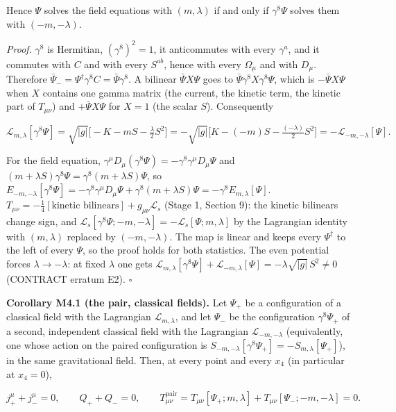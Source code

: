 \documentclass[11pt]{article}
\begin{document}
Hence $\Psi$ solves the field equations with $(m,\lambda)$ if and only if $\gamma^8\Psi$ solves them with $(-m,-\lambda)$.

\emph{Proof.} $\gamma^8$ is Hermitian, $(\gamma^8)^2=1$, it anticommutes with every $\gamma^a$, and it commutes with $C$ and with every $S^{ab}$, hence with every $\Omega_\mu$ and with $D_\mu$. Therefore $\bar\Psi_-=\Psi^\dagger\gamma^8C=\bar\Psi\gamma^8$. A bilinear $\bar\Psi X\Psi$ goes to $\bar\Psi\gamma^8X\gamma^8\Psi$, which is $-\bar\Psi X\Psi$ when $X$ contains one gamma matrix (the current, the kinetic term, the kinetic part of $T_{\mu\nu}$) and $+\bar\Psi X\Psi$ for $X=1$ (the scalar $S$). Consequently

\[
\mathcal L_{m,\lambda}[\gamma^8\Psi]=\sqrt{|g|}\bigl[-K-mS-\tfrac\lambda2S^2\bigr]=-\sqrt{|g|}\bigl[K-(-m)S-\tfrac{(-\lambda)}2S^2\bigr]=-\mathcal L_{-m,-\lambda}[\Psi].
\]

For the field equation, $\gamma^\mu D_\mu(\gamma^8\Psi)=-\gamma^8\gamma^\mu D_\mu\Psi$ and $(m+\lambda S)\gamma^8\Psi=\gamma^8(m+\lambda S)\Psi$, so $E_{-m,-\lambda}[\gamma^8\Psi]=-\gamma^8\gamma^\mu D_\mu\Psi+\gamma^8(m+\lambda S)\Psi=-\gamma^8E_{m,\lambda}[\Psi]$. $T_{\mu\nu}=-\tfrac14[\text{kinetic bilinears}]+g_{\mu\nu}\mathcal L_s$ (Stage 1, Section 9): the kinetic bilinears change sign, and $\mathcal L_s[\gamma^8\Psi;-m,-\lambda]=-\mathcal L_s[\Psi;m,\lambda]$ by the Lagrangian identity with $(m,\lambda)$ replaced by $(-m,-\lambda)$. The map is linear and keeps every $\Psi^\dagger$ to the left of every $\Psi$, so the proof holds for both statistics. The even potential forces $\lambda\to-\lambda$: at fixed $\lambda$ one gets $\mathcal L_{m,\lambda}[\gamma^8\Psi]+\mathcal L_{-m,\lambda}[\Psi]=-\lambda\sqrt{|g|}\,S^2\ne0$ (CONTRACT erratum E2). $\square$

\textbf{Corollary M4.1 (the pair, classical fields).} Let $\Psi_+$ be a configuration of a classical field with the Lagrangian $\mathcal L_{m,\lambda}$, and let $\Psi_-$ be the configuration $\gamma^8\Psi_+$ of a second, independent classical field with the Lagrangian $\mathcal L_{-m,-\lambda}$ (equivalently, one whose action on the paired configuration is $S_{-m,-\lambda}[\gamma^8\Psi_+]=-S_{m,\lambda}[\Psi_+]$), in the same gravitational field. Then, at every point and every $x_4$ (in particular at $x_4=0$),

\[
j^\mu_++j^\mu_-=0,\qquad Q_++Q_-=0,\qquad T^{\mathrm{pair}}_{\mu\nu}=T_{\mu\nu}[\Psi_+;m,\lambda]+T_{\mu\nu}[\Psi_-;-m,-\lambda]=0 .
\]
\end{document}
